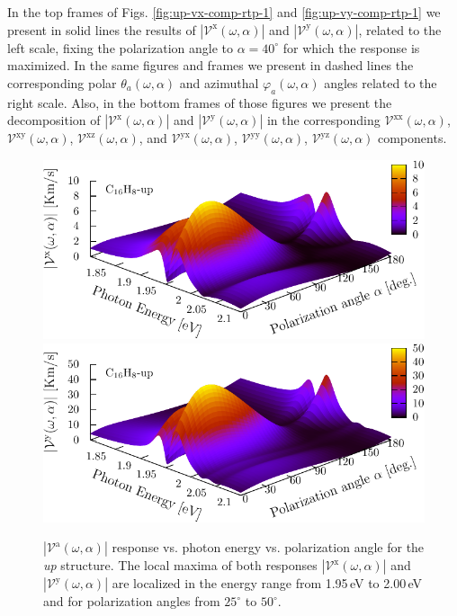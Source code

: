 \documentclass[prb,11pt,tightenlines,twocolumn,aps]{revtex4-1}
\begin{document}
In the top frames of  Figs. \ref{fig:up-vx-comp-rtp-1} and 
% 
\ref{fig:up-vy-comp-rtp-1} we present in solid lines the results of
$|\mathcal{V}^{\mathrm{x}}(\omega,\alpha)|$ and $|\mathcal{V}^{\mathrm{y}}(\omega,\alpha)|$,
related to the left scale, fixing the polarization angle to $\alpha=40^{\circ}$
for which the response is maximized. In the same
figures and frames we present in dashed lines the corresponding polar
$\theta_{a}(\omega,\alpha)$ and azimuthal $\varphi_{a}(\omega,\alpha)$ angles related to the
right scale. Also, in the bottom frames of those figures we present the
decomposition of $|\mathcal{V}^{\mathrm{x}}(\omega,\alpha)|$ and
$|\mathcal{V}^{\mathrm{y}}(\omega,\alpha)|$ in the corresponding
$\mathcal{V}^{\mathrm{xx}}(\omega,\alpha)$, $\mathcal{V}^{\mathrm{xy}}(\omega,\alpha)$,
$\mathcal{V}^{\mathrm{xz}}(\omega,\alpha)$, and $\mathcal{V}^{\mathrm{yx}}(\omega,\alpha)$,
$\mathcal{V}^{\mathrm{yy}}(\omega,\alpha)$, $\mathcal{V}^{\mathrm{yz}}(\omega,\alpha)$
components.
\begin{figure}[t]
    \centering
    \includegraphics[width=\linewidth]{upplots/up-3d-vxb-2}
    \label{fig:up-3d-vvx-2}
    \\
    \includegraphics[width=\linewidth]{upplots/up-3d-vyb-2}
    \label{fig:up-3d-vvy-2}
    
    \caption{$|\mathcal{V}^{\mathrm{a}}(\omega,\alpha)|$ response vs. photon
    energy vs. polarization angle for the \emph{up} structure. The local maxima
    of both responses $|\mathcal{V}^{\mathrm{x}}(\omega,\alpha)|$ and
    $|\mathcal{V}^{\mathrm{y}}(\omega,\alpha)|$ are localized in the energy
    range from 1.95\,eV to 2.00\,eV and for polarization angles from
    $25^{\circ}$ to $50^{\circ}$.}
    \label{fig:up-3d-vva-2}
\end{figure}
\end{document}
